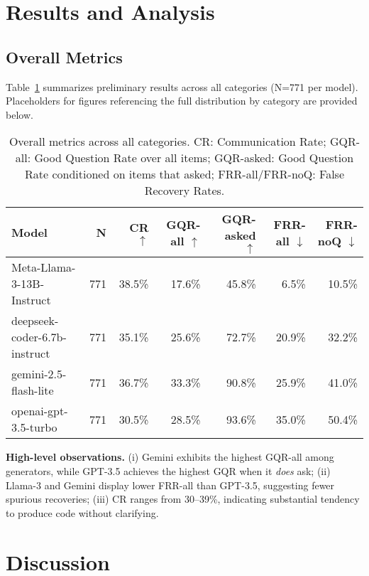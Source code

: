 \documentclass[acmsmall,screen,nonacm]{acmart}
\begin{document}
\section{Results and Analysis}
\subsection{Overall Metrics}
Table~\ref{tab:overall} summarizes preliminary results across all categories (N=771 per model). Placeholders for figures referencing the full distribution by category are provided below.


\begin{table}[H]
  \centering
  \caption{Overall metrics across all categories. CR: Communication Rate; GQR-all: Good Question Rate over all items; GQR-asked: Good Question Rate conditioned on items that asked; FRR-all/FRR-noQ: False Recovery Rates.}
  \label{tab:overall}
  \small
  \begin{tabular}{lrrrrrr}
  \toprule
  Model & N & CR $\uparrow$ & GQR-all $\uparrow$ & GQR-asked $\uparrow$ & FRR-all $\downarrow$ & FRR-noQ $\downarrow$ \\
  \midrule
  Meta-Llama-3-13B-Instruct & 771 & 38.5\% & 17.6\% & 45.8\% & 6.5\% & 10.5\% \\
  deepseek-coder-6.7b-instruct & 771 & 35.1\% & 25.6\% & 72.7\% & 20.9\% & 32.2\% \\
  gemini-2.5-flash-lite & 771 & 36.7\% & 33.3\% & 90.8\% & 25.9\% & 41.0\% \\
  openai-gpt-3.5-turbo & 771 & 30.5\% & 28.5\% & 93.6\% & 35.0\% & 50.4\% \\
  \bottomrule
  \end{tabular}
\end{table}

\noindent\textbf{High-level observations.} (i) Gemini exhibits the highest GQR-all among generators, while GPT-3.5 achieves the highest GQR when it \emph{does} ask; (ii) Llama-3 and Gemini display lower FRR-all than GPT-3.5, suggesting fewer spurious recoveries; (iii) CR ranges from 30--39\%, indicating substantial tendency to produce code without clarifying.



\section{Discussion}
\end{document}
